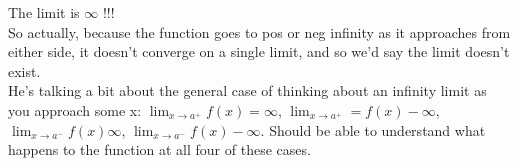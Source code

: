 \documentclass{article}
\begin{document}
The limit is $\infty$ !!!\\

So actually, because the function goes to pos or neg infinity as it approaches from either
side, it doesn't converge on a single limit, and so we'd say the limit doesn't exist.\\

He's talking a bit about the general case of thinking about an infinity limit as you
approach some x: $\lim_{x\to a^+} f(x) = \infty$, $\lim_{x \to a^+} = f(x) -\infty$,
$\lim_{x\to a^-} f(x) \infty$, $\lim_{x\to a^-} f(x) - \infty$. Should be able to
understand what happens to the function at all four of these cases.
\end{document}
